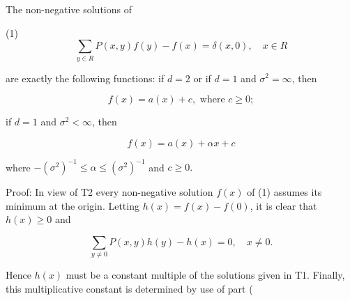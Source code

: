 The non-negative solutions of

(1) $$\sum_{y \in R} P(x,y)f(y) - f(x) = \delta(x,0), \quad x \in R$$

are exactly the following functions: if $d = 2$ or if $d = 1$ and $\sigma^2 = \infty$, then

$$f(x) = a(x) + c, \text{ where } c \geq 0;$$

if $d = 1$ and $\sigma^2 < \infty$, then

$$f(x) = a(x) + \alpha x + c$$

where $-(\sigma^2)^{-1} \leq \alpha \leq (\sigma^2)^{-1}$ and $c \geq 0.$

Proof: In view of T2 every non-negative solution $f(x)$ of (1) assumes its minimum at the origin. Letting $h(x) = f(x) - f(0)$, it is clear that $h(x) \geq 0$ and

$$\sum_{y \neq 0} P(x,y)h(y) - h(x) = 0, \quad x \neq 0.$$

Hence $h(x)$ must be a constant multiple of the solutions given in T1. Finally, this multiplicative constant is determined by use of part (